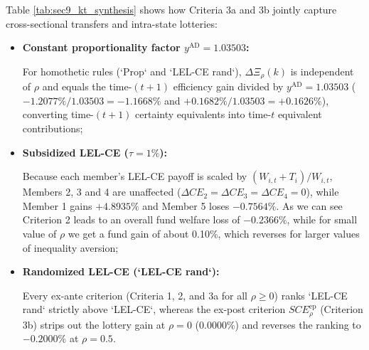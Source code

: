 Table \ref{tab:sec9_kt_synthesis} shows how Criteria 3a and 3b jointly capture cross-sectional transfers and intra-state lotteries:
\begin{itemize}
    \item \textbf{Constant proportionality factor $y^{\text{AD}} = 1.03503$:}
    
    For homothetic rules (`Prop` and `LEL-CE rand`), $\Delta \Xi_\rho(k)$ is independent of $\rho$ and equals the time-$(t+1)$ efficiency gain divided by $y^{\text{AD}} = 1.03503$ ($-1.2077\% / 1.03503 = -1.1668\%$ and $+0.1682\% / 1.03503 = +0.1626\%$), converting time-$(t+1)$ certainty equivalents into time-$t$ equivalent contributions;
    \item \textbf{Subsidized LEL-CE ($\tau = 1\%$):} 
    
    Because each member's LEL-CE payoff is scaled by $(W_{i,t} + T_i)/W_{i,t}$, Members 2, 3 and 4 are unaffected ($\Delta CE_2 = \Delta CE_3 = \Delta CE_4 = 0$), while Member 1 gains $+4.8935\%$ and Member 5 loses $-0.7564\%$. As we can see Criterion 2 leads to an overall fund welfare loss of $-0.2366\%$, while for small value of $\rho$ we get a fund gain of about 0.10\%, which reverses for larger values of inequality aversion;
    \item \textbf{Randomized LEL-CE (`LEL-CE rand`):} 
    
    Every ex-ante criterion (Criteria 1, 2, and 3a for all $\rho \ge 0$) ranks `LEL-CE rand` strictly above `LEL-CE`, whereas the ex-post criterion $SCE_\rho^{\text{ep}}$ (Criterion 3b) strips out the lottery gain at $\rho = 0$ ($0.0000\%$) and reverses the ranking to $-0.2000\%$ at $\rho = 0.5$.
\end{itemize}
